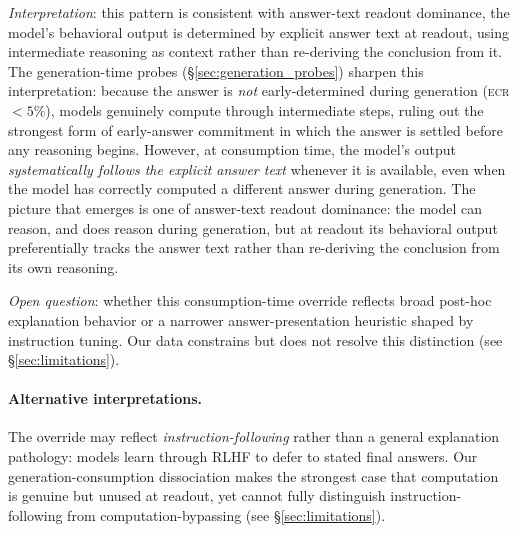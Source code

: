 \documentclass{article}
\theoremstyle{definition}
\theoremstyle{definition}
\begin{document}
\emph{Interpretation}: this pattern is consistent with
answer-text readout dominance, the model's behavioral output is determined
by explicit answer text at readout, using intermediate reasoning as
context rather than re-deriving the conclusion from it.
The generation-time probes (\S\ref{sec:generation_probes}) sharpen this
interpretation: because the answer is \emph{not} early-determined during
generation (\textsc{ecr} $< 5\%$), models genuinely compute through
intermediate steps, ruling out the strongest form of early-answer
commitment in which the answer is settled before any reasoning begins. However, at
consumption time, the model's output \emph{systematically follows the
explicit answer text} whenever it is available, even when the model has
correctly computed a different answer during generation. The picture that
emerges is one of answer-text readout dominance: the model can
reason, and does reason during generation, but at readout its behavioral
output preferentially tracks the answer text rather than re-deriving the
conclusion from its own reasoning.

\emph{Open question}: whether this consumption-time override reflects
broad post-hoc explanation behavior or a narrower answer-presentation
heuristic shaped by instruction tuning. Our data constrains but does not
resolve this distinction (see \S\ref{sec:limitations}).

\paragraph{Alternative interpretations.}
The override may reflect \emph{instruction-following} rather than a
general explanation pathology: models learn through RLHF to defer to stated final answers.
Our generation-consumption dissociation makes the strongest case that
computation is genuine but unused at readout, yet cannot fully distinguish
instruction-following from computation-bypassing
(see \S\ref{sec:limitations}).
\end{document}
